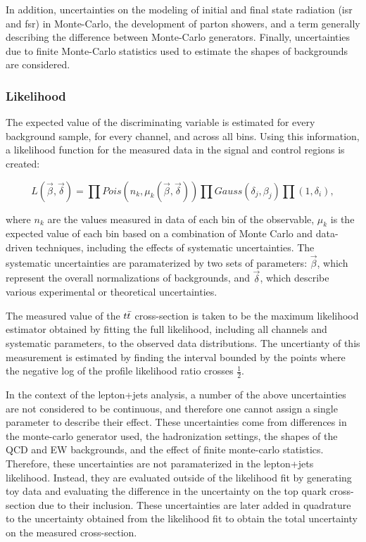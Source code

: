 In addition, uncertainties on the modeling of initial and final state radiation (isr and fsr) in Monte-Carlo, the development of parton showers, and a term generally describing the difference between Monte-Carlo generators.
Finally, uncertainties due to finite Monte-Carlo statistics used to estimate the shapes of backgrounds are considered.

%


\subsubsection{Likelihood}

The expected value of the discriminating variable is estimated for every background sample, for every channel, and across all bins.
Using this information, a likelihood function for the measured data in the signal and control regions is created:

\begin{equation}
  L(\vec{\beta}, \vec{\delta}) = \prod Pois(n_{k},\mu_{k}(\vec{\beta},\vec{\delta})) \prod Gauss(\delta_j, \beta_j) \prod( 1, \delta_i),
\end{equation}

where $n_k$ are the values measured in data of each bin of the observable, $\mu_k$ is the expected value of each bin based on a combination of Monte Carlo and data-driven techniques, including the effects of systematic uncertainties.
The systematic uncertainties are paramaterized by two sets of parameters: $\vec{\beta}$, which represent the overall normalizations of backgrounds, and $\vec{\delta}$, which describe various experimental or theoretical uncertainties.

The measured value of the $t\bar{t}$ cross-section is taken to be the maximum likelihood estimator obtained by fitting the full likelihood, including all channels and systematic parameters, to the observed data distributions.
The uncertianty of this measurement is estimated by finding the interval bounded by the points where the negative log of the profile likelihood ratio crosses $\frac{1}{2}$.

In the context of the lepton+jets analysis, a number of the above uncertainties are not considered to be continuous, and therefore one cannot assign a single parameter to describe their effect.
These uncertainties come from differences in the monte-carlo generator used, the hadronization settings, the shapes of the QCD and EW backgrounds, and the effect of finite monte-carlo statistics.
Therefore, these uncertainties are not paramaterized in the lepton+jets likelihood.
Instead, they are evaluated outside of the likelihood fit by generating toy data and evaluating the difference in the uncertainty on the top quark cross-section due to their inclusion.
These uncertainties are later added in quadrature to the uncertainty obtained from the likelihood fit to obtain the total uncertainty on the measured cross-section.


